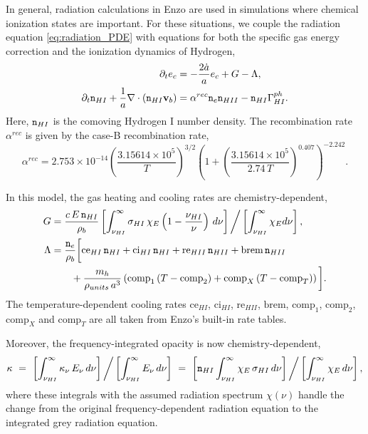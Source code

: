 \documentclass[letterpaper,10pt]{article}
\renewcommand{\(}{\left(}
\renewcommand{\)}{\right)}
\newcommand{\vb}{{\bf v}_b}
\newcommand{\rhob}{\rho_b}
\newcommand{\mn}{{\tt n}}
\begin{document}
In general, radiation calculations in Enzo are used in simulations
where chemical ionization states are important.  For these situations, 
we couple the radiation equation \eqref{eq:radiation_PDE} with
equations for both the specific gas energy correction and the
ionization dynamics of Hydrogen,
\begin{align}
  \notag
  \partial_t e_c &= -\frac{2\dot{a}}{a}e_c + G - \Lambda, \\
  \label{eq:hydrogen_ionization}
  \partial_t \mn_{HI} + \frac{1}{a}\nabla\cdot\(\mn_{HI}\vb\) &=
    \alpha^{rec} \mn_e \mn_{HII} - \mn_{HI} \Gamma_{HI}^{ph}. 
\end{align}
Here, $\mn_{HI}$ is the comoving Hydrogen I number density.  The
recombination rate $\alpha^{rec}$ is given by the case-B
recombination rate, 
\begin{equation}
\label{eq:alphaB}
\alpha^{rec} = 2.753\times 10^{-14} \left(\frac{3.15614\times 10^5}{T}\right)^{3/2} 
                   \left(1+\left(\frac{3.15614\times 10^5}{2.74\, T}\right)^{0.407}\right)^{-2.242}.
\end{equation}

In this model, the gas heating and cooling rates are
chemistry-dependent, 
\begin{align}
  \label{eq:G_nLTE}
  G &= \frac{c\,E\,\mn_{HI}}{\rhob} 
    \left[\int_{\nu_{HI}}^{\infty} \sigma_{HI}\, \chi_E
    \left(1-\frac{\nu_{HI}}{\nu}\right)\, d\nu\right] \bigg/
    \left[\int_{\nu_{HI}}^{\infty} \chi_E d\nu\right], \\
\label{eq:Lambda_nLTE}
  \Lambda &= \frac{\mn_e}{\rhob}\bigg[\text{ce}_{HI}\, \mn_{HI} 
  + \text{ci}_{HI}\, \mn_{HI} + \text{re}_{HII}\, \mn_{HII} + \text{brem}\,
  \mn_{HII} \\
  \notag &\qquad+ \frac{m_h}{\rho_{units}\, a^3} \left(\text{comp}_1\, (T-\text{comp}_2) 
    + \text{comp}_{X}\, (T-\text{comp}_{T})\right) \bigg].
\end{align}
The temperature-dependent cooling rates
$\text{ce}_{HI}$, $\text{ci}_{HI}$, $\text{re}_{HII}$, $\text{brem}$,
$\text{comp}_1$, $\text{comp}_2$, $\text{comp}_{X}$ and
$\text{comp}_{T}$ are all taken from Enzo's built-in rate tables.

Moreover, the frequency-integrated opacity is now chemistry-dependent,
\begin{equation}
\label{eq:opacityHI}
  \kappa \ = \ 
  \left[\int_{\nu_{HI}}^{\infty} \kappa_{\nu}\,E_{\nu}\,d\nu\right] \bigg/
  \left[\int_{\nu_{HI}}^{\infty} E_{\nu}\,d\nu\right] \ = \ 
  \left[\mn_{HI} \int_{\nu_{HI}}^{\infty}
    \chi_E\,\sigma_{HI}\,d\nu\right] \bigg/
  \left[\int_{\nu_{HI}}^{\infty} \chi_E\,d\nu\right],
\end{equation}
where these integrals with the assumed radiation spectrum $\chi(\nu)$
handle the change from the original frequency-dependent radiation
equation to the integrated grey radiation equation.
\end{document}
